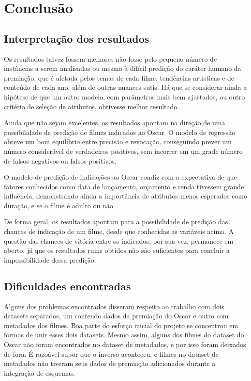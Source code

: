\chapter[Conclusão]{Conclusão}
    \section{Interpretação dos resultados}\par
        Os resultados talvez fossem melhores não fosse pelo pequeno número de instâncias a serem analisadas ou mesmo à difícil predição do caráter humano da premiação, que é afetada pelos temas de cada filme, tendências artísticas e de conteúdo de cada ano, além de outras nuances sutis. Há que se considerar ainda a hipótese de que um outro modelo, com parâmetros mais bem ajustados, ou outro critério de seleção de atributos, obtivesse melhor resultado.
        
        Ainda que não sejam excelentes, os resultados apontam na direção de uma possibilidade de predição de filmes indicados ao Oscar. O modelo de regressão obteve um bom equilíbrio entre precisão e revocação, conseguindo prever um número considerável de verdadeiros positivos, sem incorrer em um grade número de falsos negativos ou falsos positivos.
        
        O modelo de predição de indicações ao Oscar condiz com a expectativa de que fatores conhecidos como data de lançamento, orçamento e renda tivessem grande influência, demonstrando ainda a importância de atributos menos esperados como duração, e se o filme é adulto ou não.
        
        De forma geral, os resultados apontam para a possibilidade de predição das chances de indicação de um filme, desde que conhecidas as variáveis acima. A questão das chances de vitória entre os indicados, por sua vez, permanece em aberto, já que os resultados ruins obtidos não são suficientes para concluir a impossibilidade dessa predição.

    \section[Dificuldades encontradas]{Dificuldades encontradas}

        Alguns dos problemas encontrados disseram respeito ao trabalho com dois datasets separados, um contendo dados da premiação do Oscar e outro com metadados dos filmes. Boa parte do esforço inicial do projeto se concentrou em formas de unir esses dois datasets. Mesmo assim, alguns dos filmes do dataset do Oscar não foram encontrados no dataset de metadados, e por isso foram deixados de fora. É razoável supor que o inverso aconteceu, e filmes no dataset de metadados não tiveram seus dados de premiação adicionados durante a integração de esquemas.
        
